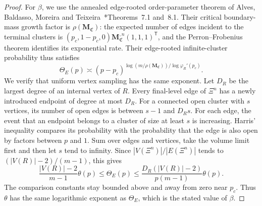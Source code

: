 \documentclass[scheme=plain,11pt]{ctexart}
\theoremstyle{definition}
\theoremstyle{remark}
\begin{document}
\begin{proof}
For $\beta$, we use the annealed edge-rooted order-parameter theorem of Alves, Baldasso, Moreira and Teixeira~\cite{alves2026percolation}*{Theorems~7.1 and~8.1}.
Their critical boundary-mass growth factor is $\rho(\mathbf M_{\mathfrak C})$: the expected number of edges incident to the terminal clusters is
$(p_c,1-p_c,0)\mathbf M_{\mathfrak C}^{,n}(1,1,1)^{\mathsf T}$,
and the Perron--Frobenius theorem identifies its exponential rate.
Their edge-rooted infinite-cluster probability thus satisfies
\[
 \Theta_E(p)\asymp
 (p-p_c)^{\log(m/\rho(\mathbf M_{\mathfrak C}))/\log\varphi_R'(p_c)}.
\]
We verify that uniform vertex sampling has the same exponent.
Let $D_R$ be the largest degree of an internal vertex of $R$.
Every final-level edge of $\Xi^n$ has a newly introduced endpoint of degree at most $D_R$.
For a connected open cluster with $s$ vertices, its number of open edges is between $s-1$ and $D_Rs$.
For each edge, the event that an endpoint belongs to a cluster of size at least $s$ is increasing.
Harris' inequality compares its probability with the probability that the edge is also open by factors between $p$ and $1$.
Sum over edges and vertices, take the volume limit first and then let $s$ tend to infinity.
Since $|V(\Xi^n)|/|E(\Xi^n)|$ tends to $(|V(R)|-2)/(m-1)$, this gives
\[
 \frac{|V(R)|-2}{m-1}\theta(p)
 \le\Theta_E(p)
 \le\frac{D_R(|V(R)|-2)}{p(m-1)}\theta(p).
\]
The comparison constants stay bounded above and away from zero near $p_c$.
Thus $\theta$ has the same logarithmic exponent as $\Theta_E$, which is the stated value of $\beta$.
\end{proof}
\end{document}
